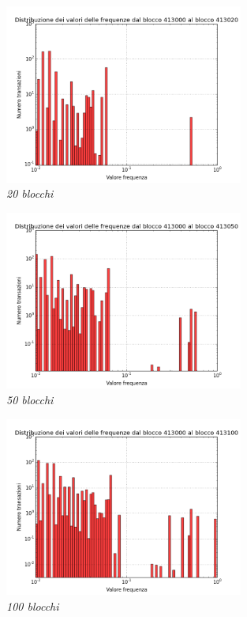 \begin{figure}[htbp]
	\centering
		\includegraphics[width=0.7\textwidth]{figure/hist20b}
		\caption{\textit{20 blocchi}\label{fig:hist20b}}
\end{figure}
	
\begin{figure}[htbp]
	\centering
		\includegraphics[width=0.7\textwidth]{figure/hist50b}
		\caption{\textit{50 blocchi}\label{fig:hist50b}}
\end{figure}

\begin{figure}[htbp]
	\centering
		\includegraphics[width=0.7\textwidth]{figure/hist100b}
		\caption{\textit{100 blocchi}\label{fig:hist100b}}
\end{figure}
	
